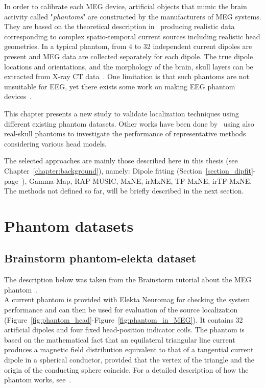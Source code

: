 In order to calibrate each MEG device, artificial objects that mimic the brain activity called "\textit{phantoms}" are constructed by the manufacturers of MEG systems.
They are based on the theoretical description in~\cite{ilmoniemi1985forward} producing realistic data corresponding to complex spatio-temporal current sources including realistic head geometries. In a typical phantom, from 4 to 32 independent current dipoles are present and MEG data are collected separately for each dipole. The true dipole locations and orientations, and the morphology of the brain, skull layers can be extracted from X-ray CT data~\cite{leahy1998study}. One limitation is that such phantoms are not unsuitable for EEG, yet there exists some work on making EEG phantom devices~\cite{hairston2016ballistic}.

This chapter presents a new study to validate localization techniques using different existing phantom datasets. Other works have been done by~\cite{hazim2015magnetoencephalography,leahy1998study,baillet2001evaluation} using also real-skull phantoms to investigate the performance of representative methods considering various head models.

The selected approaches are mainly those described here in this thesis (see Chapter~\ref{chapter:background}), namely: Dipole fitting (Section~\ref{section_dipfit}-page~\pageref{section_dipfit}), Gamma-Map, RAP-MUSIC, MxNE, irMxNE, TF-MxNE, irTF-MxNE. The methods not defined so far, will be briefly described in the next section.

\section{Phantom datasets}
\subsection{Brainstorm phantom-elekta dataset}
The description below was taken from the Brainstorm tutorial about the MEG phantom~\cite{tadel2011brainstorm}.\\

A current phantom is provided with Elekta Neuromag for checking the system performance and can then be used for evaluation of the source localization (Figure~\ref{fig:phantom_head}-Figure~\ref{fig:phantom_in_MEG}). It contains 32 artificial dipoles and four fixed head-position indicator coils. The phantom is based on the mathematical fact that an equilateral triangular line current produces a magnetic field distribution equivalent to that of a tangential current dipole in a spherical conductor, provided that the vertex of the triangle and the origin of the conducting sphere coincide. For a detailed description of how the phantom works, see~\cite{ilmoniemi1985forward}.\\
\\

